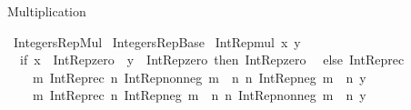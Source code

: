 %
\begin{isabellebody}%
%
%
\begin{isamarkuptext}%
Multiplication%
\end{isamarkuptext}\isamarkuptrue%
%
\isadelimtheory
%
\endisadelimtheory
%
\isatagtheory
{}\isamarkupfalse%
\ Integers{\isacharunderscore}{\kern0pt}Rep{\isacharunderscore}{\kern0pt}Mul\isanewline
{}\ Integers{\isacharunderscore}{\kern0pt}Rep{\isacharunderscore}{\kern0pt}Base\isanewline
{}%
\endisatagtheory
{\isafoldtheory}%
%
\isadelimtheory
%
\endisadelimtheory
\isanewline
\isanewline
{}\isamarkupfalse%
\ {\isachardoublequoteopen}Int{\isacharunderscore}{\kern0pt}Rep{\isacharunderscore}{\kern0pt}mul\ x\ y\ {\isasymequiv}\isanewline
\ \ if\ x\ {\isacharequal}{\kern0pt}\ Int{\isacharunderscore}{\kern0pt}Rep{\isacharunderscore}{\kern0pt}zero\ {\isasymor}\ y\ {\isacharequal}{\kern0pt}\ Int{\isacharunderscore}{\kern0pt}Rep{\isacharunderscore}{\kern0pt}zero\ then\ Int{\isacharunderscore}{\kern0pt}Rep{\isacharunderscore}{\kern0pt}zero\isanewline
\ \ else\ Int{\isacharunderscore}{\kern0pt}Rep{\isacharunderscore}{\kern0pt}rec\isanewline
\ \ \ \ {\isacharparenleft}{\kern0pt}{\isasymlambda}m{\isachardot}{\kern0pt}\ Int{\isacharunderscore}{\kern0pt}Rep{\isacharunderscore}{\kern0pt}rec\ {\isacharparenleft}{\kern0pt}{\isasymlambda}n{\isachardot}{\kern0pt}\ Int{\isacharunderscore}{\kern0pt}Rep{\isacharunderscore}{\kern0pt}nonneg\ {\isacharparenleft}{\kern0pt}m\ {\isacharasterisk}{\kern0pt}\ n{\isacharparenright}{\kern0pt}{\isacharparenright}{\kern0pt}\ {\isacharparenleft}{\kern0pt}{\isasymlambda}n{\isachardot}{\kern0pt}\ Int{\isacharunderscore}{\kern0pt}Rep{\isacharunderscore}{\kern0pt}neg\ {\isacharparenleft}{\kern0pt}m\ {\isacharasterisk}{\kern0pt}\ n{\isacharparenright}{\kern0pt}{\isacharparenright}{\kern0pt}\ y{\isacharparenright}{\kern0pt}\isanewline
\ \ \ \ {\isacharparenleft}{\kern0pt}{\isasymlambda}m{\isachardot}{\kern0pt}\ Int{\isacharunderscore}{\kern0pt}Rep{\isacharunderscore}{\kern0pt}rec\ {\isacharparenleft}{\kern0pt}{\isasymlambda}n{\isachardot}{\kern0pt}\ Int{\isacharunderscore}{\kern0pt}Rep{\isacharunderscore}{\kern0pt}neg\ {\isacharparenleft}{\kern0pt}m\ {\isacharasterisk}{\kern0pt}\ n{\isacharparenright}{\kern0pt}{\isacharparenright}{\kern0pt}\ {\isacharparenleft}{\kern0pt}{\isasymlambda}n{\isachardot}{\kern0pt}\ Int{\isacharunderscore}{\kern0pt}Rep{\isacharunderscore}{\kern0pt}nonneg\ {\isacharparenleft}{\kern0pt}m\ {\isacharasterisk}{\kern0pt}\ n{\isacharparenright}{\kern0pt}{\isacharparenright}{\kern0pt}\ y{\isacharparenright}{\kern0pt}\isanewline

\end{isabellebody}
